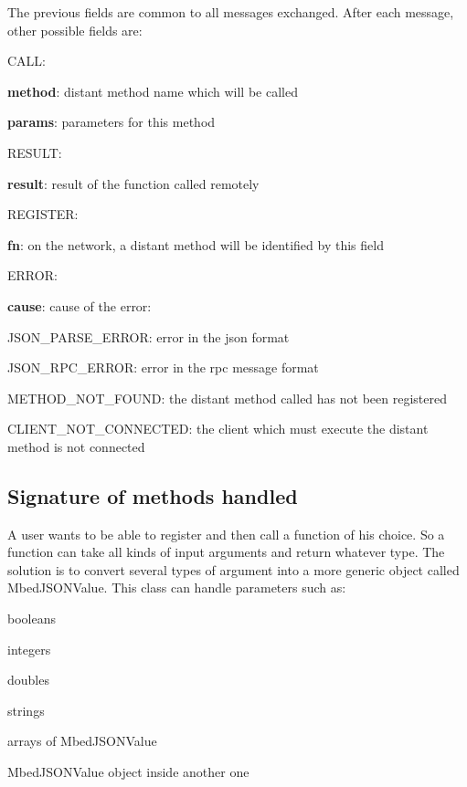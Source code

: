 \documentclass[pdftex,10pt,a4paper]{report}
\newenvironment{packed_item}{
\begin{itemize}
  \setlength{\itemsep}{1pt}
  \setlength{\parskip}{0pt}
  \setlength{\parsep}{0pt}
}{\end{itemize}}
\begin{document}
The previous fields are common to all messages exchanged. After each message, other possible fields are:


\begin{packed_item}
	\item CALL:
		\begin{packed_item}
			\item \textbf{method}: distant method name which will be called
			\item \textbf{params}: parameters for this method
		\end{packed_item}
	\item RESULT:
		\begin{packed_item}
			\item \textbf{result}: result of the function called remotely
		\end{packed_item}
	\item REGISTER:
		\begin{packed_item}
			\item \textbf{fn}: on the network, a distant method will be identified by this field
		\end{packed_item}
	\item ERROR:
		\begin{packed_item}
			\item \textbf{cause}: cause of the error:
			\begin{packed_item}
				\item JSON\_PARSE\_ERROR: error in the json format
				\item JSON\_RPC\_ERROR: error in the rpc message format
				\item METHOD\_NOT\_FOUND: the distant method called has not been registered
				\item CLIENT\_NOT\_CONNECTED: the client which must execute the distant method is not connected
			\end{packed_item}
		\end{packed_item}
\end{packed_item}

\subsection{Signature of methods handled}
A user wants to be able to register and then call a function of his choice. So a function can take all kinds of input arguments and return whatever type. The solution is to convert several types of argument into a more generic object called MbedJSONValue. This class can handle parameters such as:
\begin{packed_item}
	\item booleans
	\item integers
	\item doubles
	\item strings
	\item arrays of MbedJSONValue
	\item MbedJSONValue object inside another one
\end{packed_item}
\end{document}
